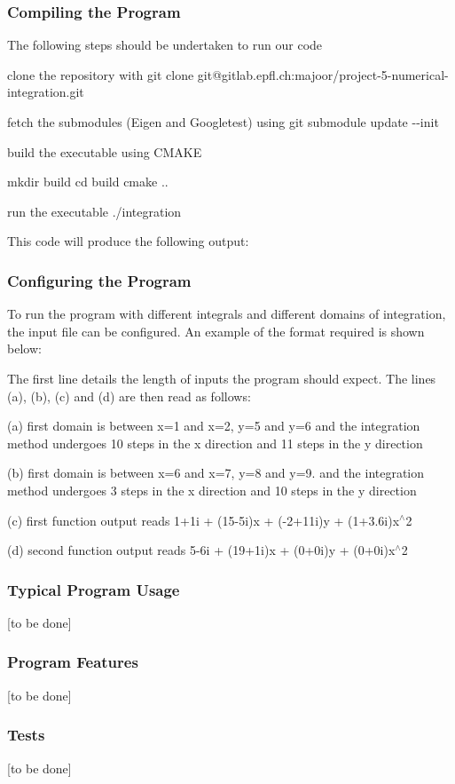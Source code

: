 \subsubsection*{Compiling the Program}

The following steps should be undertaken to run our code
\begin{DoxyItemize}
\item clone the repository with {\ttfamily git clone git@gitlab.\+epfl.\+ch\+:majoor/project-\/5-\/numerical-\/integration.\+git}
\item fetch the submodules (Eigen and Googletest) using {\ttfamily git submodule update -\/-\/init}
\item build the executable using C\+M\+A\+KE 
\begin{DoxyCode}
mkdir build
cd build
cmake ..
\end{DoxyCode}

\item run the executable {\ttfamily ./integration}
\end{DoxyItemize}

This code will produce the following output\+: 
\begin{DoxyCode}
\end{DoxyCode}


\subsubsection*{Configuring the Program}

To run the program with different integrals and different domains of integration, the input file can be configured. An example of the format required is shown below\+:



The first line details the length of inputs the program should expect. The lines (a), (b), (c) and (d) are then read as follows\+:
\begin{DoxyItemize}
\item (a) first domain is between x=1 and x=2, y=5 and y=6 and the integration method undergoes 10 steps in the x direction and 11 steps in the y direction
\item (b) first domain is between x=6 and x=7, y=8 and y=9. and the integration method undergoes 3 steps in the x direction and 10 steps in the y direction
\item (c) first function output reads 1+1i + (15-\/5i)x + (-\/2+11i)y + (1+3.6i)x$^\wedge$2
\item (d) second function output reads 5-\/6i + (19+1i)x + (0+0i)y + (0+0i)x$^\wedge$2
\end{DoxyItemize}

\subsubsection*{Typical Program Usage}

\mbox{[}to be done\mbox{]}

\subsubsection*{Program Features}

\mbox{[}to be done\mbox{]}

\subsubsection*{Tests}

\mbox{[}to be done\mbox{]} 